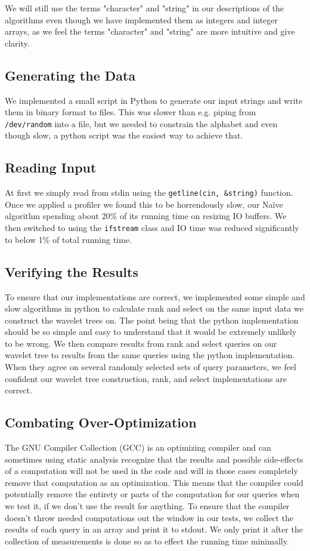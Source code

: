 We will still use the terms "character" and "string" in our descriptions of the algorithms even though we have implemented them as integers and integer arrays, as we feel the terms "character" and "string" are more intuitive and give clarity.


\subsection{Generating the Data}
We implemented a small script in Python to generate our input strings and write them in binary format to files.
This was slower than e.g. piping from \texttt{/dev/random} into a file, but we needed to constrain the alphabet and even though slow, a python script was the easiest way to achieve that.

\subsection{Reading Input}
At first we simply read from stdin using the \texttt{getline(cin, \&string)} function. 
Once we applied a profiler we found this to be horrendously slow, our Naïve algorithm spending about 20\% of its running time on resizing IO buffers. 
We then switched to using the \texttt{ifstream} class and IO time was reduced significantly to below 1\% of total running time.

\subsection{Verifying the Results}
To ensure that our implementations are correct, we implemented some simple and slow algorithms in python to calculate rank and select on the same input data we construct the wavelet trees on.
The point being that the python implementation should be so simple and easy to understand that it would be extremely unlikely to be wrong.
We then compare results from rank and select queries on our wavelet tree to results from the same queries using the python implementation.
When they agree on several randomly selected sets of query parameters, we feel confident our wavelet tree construction, rank, and select implementations are correct.

\subsection{Combating Over-Optimization}
The GNU Compiler Collection (GCC) is an optimizing compiler and can sometimes using static analysis recognize that the results and possible side-effects of a computation will not be used in the code and will in those cases completely remove that computation as an optimization.
This means that the compiler could potentially remove the entirety or parts of the computation for our queries when we test it, if we don't use the result for anything.
To ensure that the compiler doesn't throw needed computations out the window in our tests, we collect the results of each query in an array and print it to stdout. We only print it after the collection of measurements is done so as to effect the running time minimally.

